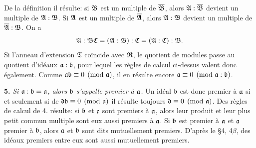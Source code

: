 De la définition il résulte: si $\mathfrak{B}$ est un multiple de $\overline{\mathfrak{B}}$, alors $\mathfrak{A}:\overline{\mathfrak{B}}$ devient un multiple de $\mathfrak{A}:\mathfrak{B}$. Si $\mathfrak{A}$ est un multiple de $\overline{\mathfrak{A}}$, alors $\mathfrak{A}:\mathfrak{B}$ devient un multiple de $\overline{\mathfrak{A}}:\mathfrak{B}$. On a
\[
        \mathfrak{A}:\mathfrak{B}\mathfrak{C}=(\mathfrak{A}:\mathfrak{B}):\mathfrak{C}=(\mathfrak{A}:\mathfrak{C}):\mathfrak{B} .
\]
Si l'anneau d'extension $\mathfrak{T}$ coïncide avec $\mathfrak{R}$, le quotient de modules passe au quotient d'idéaux $\mathfrak{a}:\mathfrak{b}$, pour lequel les règles de calcul ci-dessus valent donc également. Comme $\mathfrak{a}\mathfrak{b}\equiv0\pmod{\mathfrak{a}}$, il en résulte encore $\mathfrak{a}\equiv0\pmod{\mathfrak{a}:\mathfrak{b}}$.

\textbf{5.} \emph{Si $\mathfrak{a}:\mathfrak{b}=\mathfrak{a}$, alors $\mathfrak{b}$ s'appelle premier à $\mathfrak{a}$.} Un idéal $\mathfrak{b}$ est donc premier à $\mathfrak{a}$ si et seulement si de $\mathfrak{d}\mathfrak{b}\equiv0\pmod{\mathfrak{a}}$ il résulte toujours $\mathfrak{d}\equiv0\pmod{\mathfrak{a}}$. Des règles de calcul de 4. résulte: si $\mathfrak{b}$ et $\mathfrak{c}$ sont premiers à $\mathfrak{a}$, alors leur produit et leur plus petit commun multiple sont eux aussi premiers à $\mathfrak{a}$. Si $\mathfrak{b}$ est premier à $\mathfrak{a}$ et $\mathfrak{a}$ premier à $\mathfrak{b}$, alors $\mathfrak{a}$ et $\mathfrak{b}$ sont dits mutuellement premiers. D'après le \S{}4, 4$\beta$, des idéaux premiers entre eux sont aussi mutuellement premiers.

\setcounter{footnote}{25}
